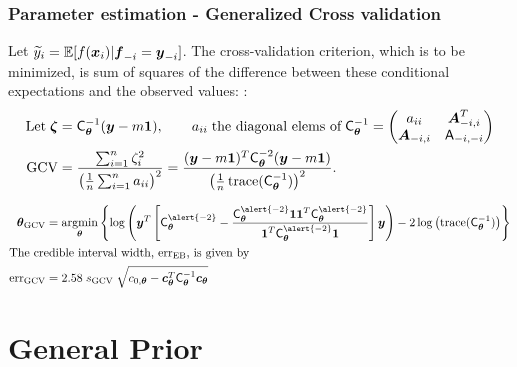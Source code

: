 \documentclass[handout, 10pt,compress,xcolor={usenames,dvipsnames}]{beamer} %
\newcommand{\bm}[1]{\boldsymbol{#1}}
\newcommand{\Ex}{\mathbb{E}}
\newcommand{\MLE}{\textup{EB}}
\newcommand{\GCV}{\textup{GCV}}
\newcommand{\mCtheta}{\mC_{\vtheta}}
\newcommand{\mCthetaInv}{{\mathsf{C}^{-1}_{\vtheta}}}
\newcommand{\err}{{\text{err}}}
\renewcommand{\ty}{\widetilde{y}}
\renewcommand{\vtheta}{{\bm{\theta}}}
\newcommand{\pause}{}
\begin{document}

\begin{frame}
	\frametitle{Parameter estimation - Generalized Cross validation}
	\vspace*{-5ex}
	Let $\ty_i = \Ex[f(\vx_i ) | \vf_{-i} = \vy_{-i}]$.
	The cross-validation criterion, which is to be minimized, is sum of squares of the difference between these conditional expectations and the observed values: :
	\vspace*{-2.0ex}
	\begin{align*}
	\text{Let}\; \bm{\zeta} &= \mCthetaInv(\vy - m \vone), 
	\qquad a_{ii} \; \text{the diagonal elems of} \; \mCthetaInv = \begin{pmatrix} a_{ii}  & \vA_{-i,i}^T \\  \vA_{-i,i} & \mA_{-i,-i}\end{pmatrix}
	\\
	\GCV &
	= \frac{\sum_{i=1}^n\zeta_i^2}{\left(\frac 1n \sum_{i=1}^n a_{ii} \right)^2} 
	= \frac{(\vy - m\vone)^T \mCtheta^{-2} (\vy - m \vone)}{\left(\frac 1n \trace(\mCthetaInv) \right)^2}.
	\end{align*}
	\pause
	\vspace{-2ex}
	\begin{align*}
	\vtheta_{\GCV} &= \argmin_{\vtheta} \left\{\log \left(  \vy^T \left[\mCtheta^{\alert{-2}} - \frac{\mCtheta^{\alert{-2}} \vone \vone^T \mCtheta^{\alert{-2}}}{\vone^T \mCtheta^{\alert{-2}} \vone}  \right] \vy \right)  
	- 2 \log \left ( \trace(\mCthetaInv) \right ) \right\}
	\\
	\intertext{The credible interval width, $\err_{\MLE}$, is given by}
	\err_{\GCV} & = 2.58 \; s_{\GCV} \; \sqrt{c_{0,\vtheta} - \vc_{\vtheta}^T\mCthetaInv\vc_{\vtheta} }
	\end{align*}
\end{frame}



\section{General Prior}
\end{document}
